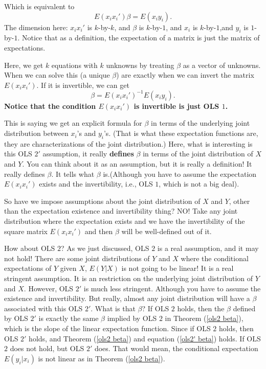 \documentclass[11pt,a4paper]{amsart}
\theoremstyle{plain}
\theoremstyle{definition}
\begin{document}
 	Which is equivalent to 
 	\[  E(x_{i} x_{i}')\beta =	E(x_{i}y_{i}). 	\]
 	The dimension here: $x_{i} x_{i}'$ is $k$-by-$k$, and $\beta$ is $k$-by-$1$, and $x_{i}$ is $k$-by-$1$,and  $y_{i}$ is $1$-by-$1$. Notice that as a definition, the expectation of a matrix is just the matrix of expectations.\par 
 	Here, we get $k$ equations with $k$ unknowns by treating $\beta$ as a vector of unknowns. When we can solve this (a unique $\beta$) are exactly when we can invert the matrix $E(x_{i} x_{i}')$. If it is invertible, we can get
 	\begin{equation}\label{ols2' beta}
 	\beta =	E(x_{i} x_{i}') ^{-1} E(x_{i}y_{i}).
 	\end{equation}
  	\textbf{Notice that the condition $E(x_{i} x_{i}')$ is invertible is just OLS $1$.}\par 
 	This is saying we get an explicit formula for $\beta$ in terms of the underlying joint distribution between $x_{i}$'s and $y_{i}$'s. (That is what these expectation functions are, they are characterizations of the joint distribution.)  Here, what is interesting is this OLS $2'$ assumption, it really \textbf{defines} $\beta$ in terms of the joint distribution of $X$ and $Y$. You can think about it as an assumption, but it is really a definition! It really defines $\beta$. It tells what $\beta$ is.(Although you have to assume the expectation $E(x_{i} x_{i}')$ exists and the invertibility, i.e., OLS $1$, which is not a big deal).\par 
 	So have we impose assumptions about the joint distribution of $X$ and $Y$, other than the expectation existence and invertibility thing? NO! Take any joint distribution where the expectation exists and we have the invertibility of the square matrix $E(x_{i}x_{i}')$ and then $\beta$ will be well-defined out of it.\par 
 	How about OLS $2$? As we just discussed, OLS $2$ is a real assumption, and it may not hold! There are some joint distributions of $Y$ and $X$ where the conditional expectations of $Y$ given $X$, $E(Y | X)$ is not going to be linear! It is a real stringent assumption. It is an restriction on the underlying joint distribution of $Y$ and $X$. However, OLS $2'$ is much less stringent. Although you have to assume the existence and invertibility. But really, almost any joint distribution will have a $\beta$ associated with this OLS $2'$. What is that $\beta$? If OLS $2$ holds, then the $\beta$ defined by OLS $2'$ is exactly the same $\beta$ implied by OLS $2$ in Theorem (\ref{ols2 beta}), which is the slope of the linear expectation function. Since if OLS $2$ holds, then OLS $2'$ holds, and Theorem (\ref{ols2 beta}) and equation (\ref{ols2' beta}) holds. If OLS $2$ does not hold, but OLS $2'$ does. That would mean, the conditional expectation $E(y_{i} | x_{i})$ is not linear as in Theorem (\ref{ols2 beta}).\par 
\end{document}
